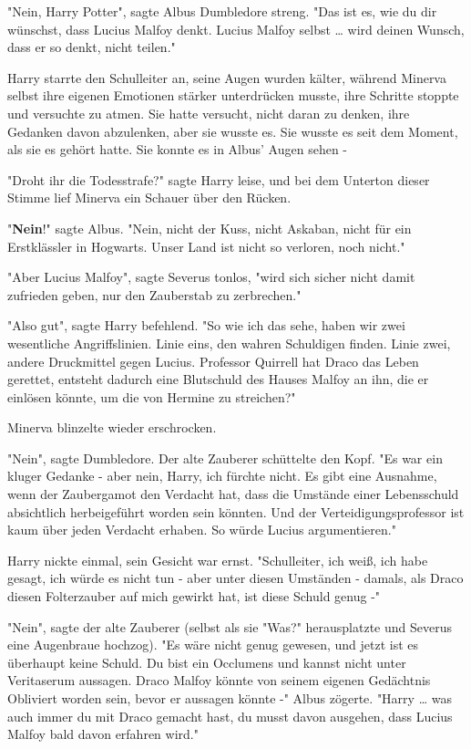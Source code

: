 {"Nein, Harry Potter", sagte Albus Dumbledore streng. "Das ist es, wie du dir wünschst, dass Lucius Malfoy denkt. Lucius Malfoy selbst … wird deinen Wunsch, dass er so denkt, nicht teilen."

Harry starrte den Schulleiter an, seine Augen wurden kälter, während Minerva selbst ihre eigenen Emotionen stärker unterdrücken musste, ihre Schritte stoppte und versuchte zu atmen. Sie hatte versucht, nicht daran zu denken, ihre Gedanken davon abzulenken, aber sie wusste es. Sie wusste es seit dem Moment, als sie es gehört hatte. Sie konnte es in Albus' Augen sehen -

"Droht ihr die Todesstrafe?" sagte Harry leise, und bei dem Unterton dieser Stimme lief Minerva ein Schauer über den Rücken.

"\textbf{Nein}!" sagte Albus. "Nein, nicht der Kuss, nicht Askaban, nicht für ein Erstklässler in Hogwarts. Unser Land ist nicht so verloren, noch nicht."

"Aber Lucius Malfoy", sagte Severus tonlos, "wird sich sicher nicht damit zufrieden geben, nur den Zauberstab zu zerbrechen."

"Also gut", sagte Harry befehlend. "So wie ich das sehe, haben wir zwei wesentliche Angriffslinien. Linie eins, den wahren Schuldigen finden. Linie zwei, andere Druckmittel gegen Lucius. Professor Quirrell hat Draco das Leben gerettet, entsteht dadurch eine Blutschuld des Hauses Malfoy an ihn, die er einlösen könnte, um die von Hermine zu streichen?"

Minerva blinzelte wieder erschrocken.

"Nein", sagte Dumbledore. Der alte Zauberer schüttelte den Kopf. "Es war ein kluger Gedanke - aber nein, Harry, ich fürchte nicht. Es gibt eine Ausnahme, wenn der Zaubergamot den Verdacht hat, dass die Umstände einer Lebensschuld absichtlich herbeigeführt worden sein könnten. Und der Verteidigungsprofessor ist kaum über jeden Verdacht erhaben. So würde Lucius argumentieren."

Harry nickte einmal, sein Gesicht war ernst. "Schulleiter, ich weiß, ich habe gesagt, ich würde es nicht tun - aber unter diesen Umständen - damals, als Draco diesen Folterzauber auf mich gewirkt hat, ist diese Schuld genug -"

"Nein", sagte der alte Zauberer (selbst als sie "Was?" herausplatzte und Severus eine Augenbraue hochzog). "Es wäre nicht genug gewesen, und jetzt ist es überhaupt keine Schuld. Du bist ein Occlumens und kannst nicht unter Veritaserum aussagen. Draco Malfoy könnte von seinem eigenen Gedächtnis Obliviert worden sein, bevor er aussagen könnte -" Albus zögerte. "Harry … was auch immer du mit Draco gemacht hast, du musst davon ausgehen, dass Lucius Malfoy bald davon erfahren wird."

}
